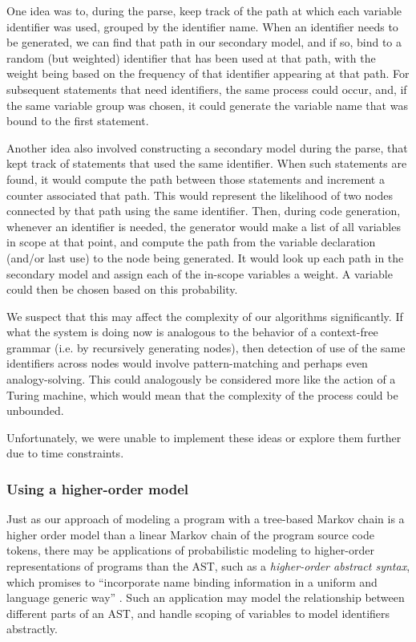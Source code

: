 \documentclass{article}
\begin{document}
One idea was to, during the parse, keep track of the path at which each variable identifier was used, grouped by the identifier name. When an identifier needs to be generated, we can find that path in our secondary model, and if so, bind to a random (but weighted) identifier that has been used at that path, with the weight being based on the frequency of that identifier appearing at that path. For subsequent statements that need identifiers, the same process could occur, and, if the same variable group was chosen, it could generate the variable name that was bound to the first statement.

Another idea also involved constructing a secondary model during the parse, that kept track of statements that used the same identifier. When such statements are found, it would compute the path between those statements and increment a counter associated that path. This would represent the likelihood of two nodes connected by that path using the same identifier. Then, during code generation, whenever an identifier is needed, the generator would make a list of all variables in scope at that point, and compute the path from the variable declaration (and/or last use) to the node being generated. It would look up each path in the secondary model and assign each of the in-scope variables a weight. A variable could then be chosen based on this probability.

We suspect that this may affect the complexity of our algorithms significantly. If what the system is doing now is analogous to the behavior of a context-free grammar (i.e. by recursively generating nodes), then detection of use of the same identifiers across nodes would involve pattern-matching and perhaps even analogy-solving. This could analogously be considered more like the action of a Turing machine, which would mean that the complexity of the process could be unbounded.

Unfortunately, we were unable to implement these ideas or explore them further due to time constraints.

\subsubsection{Using a higher-order model}

Just as our approach of modeling a program with a tree-based Markov chain is a
higher order model than a linear Markov chain of the program source code tokens,
there may be applications of probabilistic modeling to higher-order
representations of programs than the AST, such as a \emph{higher-order abstract syntax}, which promises to ``incorporate name binding information in a uniform and language generic way'' \cite{hosa}. Such an application may model the relationship between different
parts of an AST, and handle scoping of variables to model identifiers
abstractly.
\end{document}
